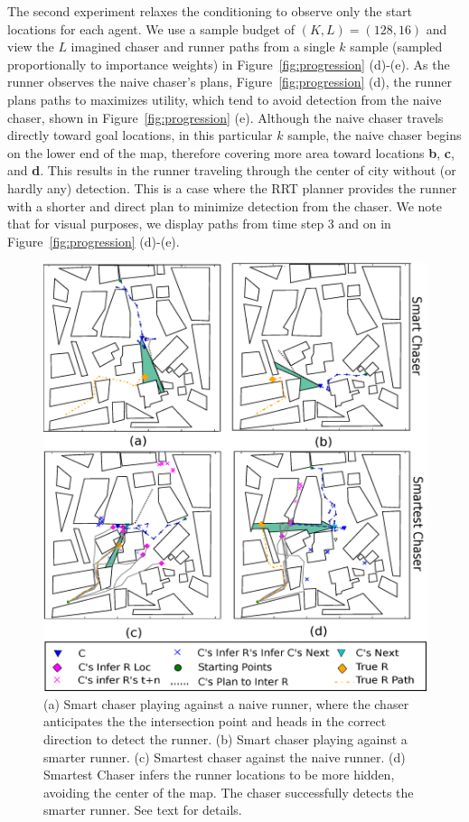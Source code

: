 \documentclass[twoside]{article}
\begin{document}
The second experiment relaxes the conditioning to observe only the start locations for each agent. We use a sample budget of $(K,L) = (128, 16)$ and view the $L$ imagined chaser and runner paths from a single $k$ sample (sampled proportionally to importance weights) in Figure~\ref{fig:progression} (d)-(e). As the runner observes the naive chaser's plans,  Figure~\ref{fig:progression} (d), the runner plans paths to maximizes utility, which tend to avoid detection from the naive chaser,  shown in Figure~\ref{fig:progression} (e). Although the naive chaser travels directly toward goal locations, in this particular $k$ sample, the naive chaser begins on the lower end of the map, therefore covering more area toward locations \textbf{b}, \textbf{c}, and \textbf{d}. This results in the runner traveling through the center of city without (or hardly any) detection.  This is a case where the RRT planner provides the runner with  a shorter and direct plan to minimize detection from the chaser. We note that for visual purposes, we display paths from time step 3 and on in Figure~\ref{fig:progression} (d)-(e). 



\begin{figure}[!t]
\begin{center}
\centerline{\includegraphics[width=0.9\columnwidth]{detection_examples.eps}}
\caption{(a) Smart chaser playing against a naive runner, where the chaser anticipates the the intersection point and heads in the correct direction to detect the runner. (b) Smart chaser playing against a smarter runner. (c) Smartest chaser against the naive runner. (d) Smartest Chaser infers the runner locations to be more hidden, avoiding the center of the map. The chaser successfully detects the smarter runner. See text for details. }
\label{fig:exps}
\end{center}
\vskip -0.4in
\end{figure} 
\end{document}
